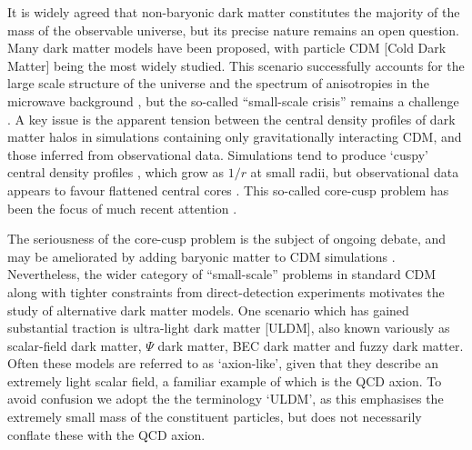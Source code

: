 \documentclass{pasa}%
\begin{document}
It is widely agreed that non-baryonic dark matter constitutes the majority of the mass of the observable universe, but its precise nature remains an open question. Many dark matter models have been proposed, with particle CDM [Cold Dark Matter]  being the most widely studied. This scenario successfully accounts for the large scale structure of the universe \cite{Springel:2005nw} and the spectrum of anisotropies in the microwave background \cite{deBernardis:2000sbo, Hanany:2000qf, Halverson:2001yy, Netterfield:2001yq, Lee:2001yp, Ade:2015xua,  Hu:2001bc}, but the so-called ``small-scale crisis''  remains a challenge \cite{Weinberg:2013aya}. A key issue is the apparent tension between the  central density profiles of dark matter halos in simulations containing only gravitationally interacting CDM, and those inferred from observational data. Simulations tend to produce `cuspy' central density profiles \cite{Navarro:1995iw}, which grow as $1/r$ at small radii, but observational data appears to favour flattened central cores \cite{Moore:1994yx}. This so-called core-cusp problem has been the focus of much recent attention \cite{Dutton:2018nop, Read:2018pft, Genina:2018}. 
 
The seriousness of the core-cusp problem is the subject of ongoing debate, and may be ameliorated by adding baryonic matter to CDM simulations \cite{Benitez-Llambay:2018}. Nevertheless, the wider category of  ``small-scale'' problems in standard CDM along with tighter constraints from direct-detection experiments \cite{Schumann:2019eaa} motivates the study of alternative dark matter models. One scenario which has gained substantial traction is ultra-light dark matter [ULDM], also known variously as scalar-field dark matter, $\Psi$ dark matter, BEC dark matter and fuzzy dark matter. Often these models are referred to as `axion-like', given that they describe an extremely light scalar field, a familiar example of which is the QCD axion. To avoid confusion we adopt the the terminology `ULDM', as this emphasises the extremely small mass of the constituent particles, but does not necessarily conflate these with the QCD axion. 
\end{document}
